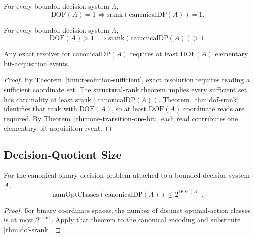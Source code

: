 \begin{corollary}\label{cor:rank-one}
For every bounded decision system $A$,
\[
\mathrm{DOF}(A)=1 \iff \mathrm{srank}(\mathrm{canonicalDP}(A))=1.
\]
\end{corollary}

\begin{corollary}\label{cor:rank-above-one}
For every bounded decision system $A$,
\[
\mathrm{DOF}(A)>1 \implies \mathrm{srank}(\mathrm{canonicalDP}(A))>1.
\]
\end{corollary}

\begin{theorem}\label{thm:min-bit-operations}
Any exact resolver for $\mathrm{canonicalDP}(A)$ requires at least $\mathrm{DOF}(A)$ elementary bit-acquisition events.
\end{theorem}

\begin{proof}
By Theorem~\ref{thm:resolution-sufficient}, exact resolution requires reading a sufficient coordinate set. The structural-rank theorem implies every sufficient set has cardinality at least $\mathrm{srank}(\mathrm{canonicalDP}(A))$. Theorem~\ref{thm:dof-srank} identifies that rank with $\mathrm{DOF}(A)$, so at least $\mathrm{DOF}(A)$ coordinate reads are required. By Theorem~\ref{thm:one-transition-one-bit}, each read contributes one elementary bit-acquisition event.
\end{proof}

\subsection{Decision-Quotient Size}

\begin{theorem}\label{thm:numopt-bound}
For the canonical binary decision problem attached to a bounded decision system $A$,
\[
\mathrm{numOptClasses}(\mathrm{canonicalDP}(A)) \le 2^{\mathrm{DOF}(A)}.
\]
\end{theorem}

\begin{proof}
For binary coordinate spaces, the number of distinct optimal-action classes is at most $2^{\mathrm{srank}}$. Apply that theorem to the canonical encoding and substitute \ref{thm:dof-srank}.
\end{proof}

